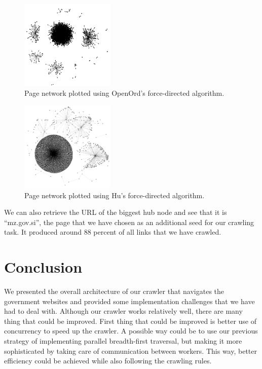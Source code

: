 \documentclass[9pt]{IEEEtran}
\begin{document}
\begin{figure}[h] \centering
    \includegraphics[width=0.4\textwidth]{../analysis/openord.png}
    \caption{{Page network plotted using OpenOrd's force-directed algorithm.}}
    \label{fig:openord}
\end{figure}


\begin{figure}[h] \centering
    \includegraphics[width=0.4\textwidth]{../analysis/hu.png}
    \caption{{Page network plotted using Hu's force-directed algorithm.}}
    \label{fig:hu}
\end{figure}

We can also retrieve the URL of the biggest hub node and see that it is ``mz.gov.si'', the page that we have chosen as an additional seed for our crawling task. 
It produced around $88$ percent of all links that we have crawled.

\section{Conclusion}\label{sec:Conclusion}
We presented the overall architecture of our crawler that navigates the government websites and provided some implementation challenges that we have had to deal with.
Although our crawler works relatively well, there are many thing that could be improved.
First thing that could be improved is better use of concurrency to speed up the crawler.
A possible way could be to use our previous strategy of implementing parallel breadth-first traversal, but making it more sophisticated by taking care of communication between workers.
This way, better efficiency could be achieved while also following the crawling rules.
\end{document}
